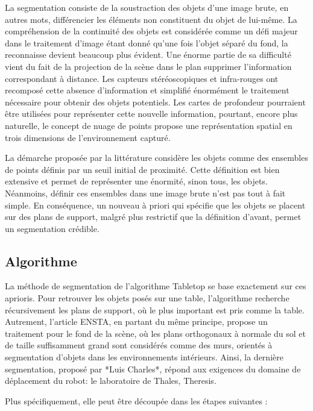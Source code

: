 La segmentation consiste de la soustraction des objets d'une image brute, en autres mots, différencier les éléments non constituent du objet de lui-même. La compréhension de la continuité des objets est considérée comme un défi majeur dans le traitement d'image étant donné qu'une fois l'objet séparé du fond, la reconnaisse devient beaucoup plus évident. Une énorme partie de sa difficulté vient du fait de la projection de la scène dans le plan supprimer l'information
correspondant à distance. Les capteurs stéréoscopiques et infra-rouges ont recomposé cette absence d'information et simplifié énormément le traitement nécessaire pour obtenir des objets potentiels. Les cartes de profondeur pourraient être utilisées pour représenter cette nouvelle information, pourtant, encore plus naturelle, le concept de nuage de points propose une représentation spatial en trois dimensions de l'environnement capturé.

La démarche proposée par la littérature considère les objets comme des
ensembles de points définis par un seuil initial de proximité. Cette
définition est bien extensive et permet de représenter une énormité,
sinon tous, les objets. Néanmoins, définir ces ensembles dans une
image brute n'est pas tout à fait simple. En conséquence, un nouveau à
priori qui spécifie que les objets se placent sur des plans de
support, malgré plus restrictif que la définition d'avant, permet un
segmentation crédible.

\subsection{Algorithme}

La méthode de segmentation de l’algorithme Tabletop
se base exactement sur ces aprioris. Pour retrouver les objets posés
sur une table, l'algorithme recherche récursivement les plans de
support, où le plus important est pris comme la table. Autrement,
l'article {\color{blue}ENSTA}, en partant du même principe, propose un
traitement pour le fond de la scène, où les plans orthogonaux à
normale du sol et de taille suffisamment grand sont considérés comme
des murs, orientés à segmentation d'objets dans les environnements
intérieurs. Ainsi, la dernière segmentation, proposé par *Luis
Charles*, répond aux exigences du domaine de déplacement du robot: le
laboratoire de Thales, Theresis.

Plus spécifiquement, elle peut être découpée dans les étapes suivantes
:

